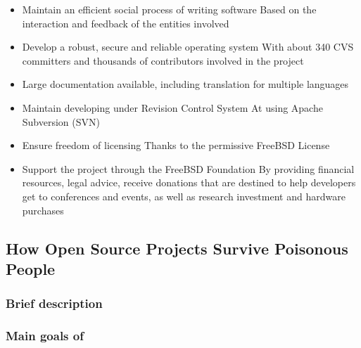 \documentclass[11pt]{article} %
\begin{document}
\begin{itemize}
  \item Maintain an efficient social process of writing software  
    Based on the interaction and feedback of the entities involved
  
  \item Develop a robust, secure and reliable operating system
    With about 340 CVS committers and thousands of contributors involved in the project
  
  \item Large documentation available, including translation for multiple languages
  
  \item Maintain developing under Revision Control System
	At using Apache Subversion (SVN)   
  
  \item Ensure freedom of licensing
	Thanks to the permissive FreeBSD License  

  \item Support the project through the FreeBSD Foundation
	By providing financial resources, legal advice, receive donations that are destined to help developers get to conferences and events, as well as research investment and hardware purchases
  
  
\end{itemize}


\subsection{How Open Source Projects Survive Poisonous People}


\subsubsection{Brief description}

\subsubsection{Main goals of }

\end{document}
